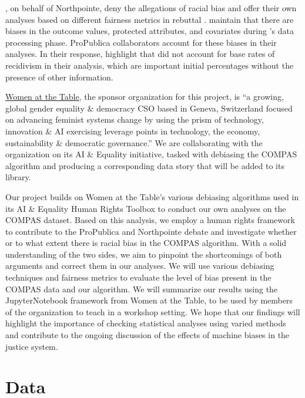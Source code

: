 \documentclass[,article,,moreauthors,pdftex]{mdpi}
\begin{document}
\citet{equivant_response_2016}, on behalf of Northpointe, deny the
allegations of racial bias and offer their own analyses based on
different fairness metrics in rebuttal \citep{equivant_response_2016}.
\citet{angwin2016machine} maintain that there are biases in the outcome
values, protected attributes, and covariates during
\citet{equivant_response_2016}'s data processing phase. ProPublica
collaborators \citet{larson2016we} account for these biases in their
analyses. In their response, \citet{equivant_response_2016} highlight
that \citet{angwin2016machine} did not account for base rates of
recidivism in their analysis, which are important initial percentages
without the presence of other information.

\href{https://www.womenatthetable.net/}{Women at the Table}, the sponsor
organization for this project, is ``a growing, global gender equality \&
democracy CSO based in Geneva, Switzerland focused on advancing feminist
systems change by using the prism of technology, innovation \& AI
exercising leverage points in technology, the economy, sustainability \&
democratic governance.'' We are collaborating with the organization on
its AI \& Equality \citep{noauthor_ai_nodate} initiative, tasked with
debiasing the COMPAS algorithm \citep{aif360-oct-2018} and producing a
corresponding data story that will be added to its library.

Our project builds on Women at the Table's various debiasing algorithms
used in its AI \& Equality Human Rights Toolbox to conduct our own
analyses on the COMPAS dataset. Based on this analysis, we employ a
human rights framework to contribute to the ProPublica and Northpointe
debate and investigate whether or to what extent there is racial bias in
the COMPAS algorithm. With a solid understanding of the two sides, we
aim to pinpoint the shortcomings of both arguments and correct them in
our analyses. We will use various debiasing techniques and fairness
metrics to evaluate the level of bias present in the COMPAS data and our
algorithm. We will summarize our results using the JupyterNotebook
framework from Women at the Table, to be used by members of the
organization to teach in a workshop setting. We hope that our findings
will highlight the importance of checking statistical analyses using
varied methods and contribute to the ongoing discussion of the effects
of machine biases in the justice system.

\hypertarget{data}{%
\section{Data}\label{data}}
\end{document}
